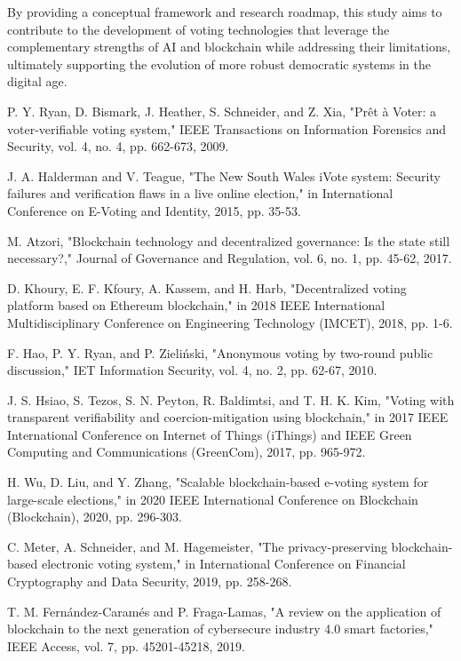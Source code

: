 \documentclass[conference]{IEEEtran}
\begin{document}
By providing a conceptual framework and research roadmap, this study aims to contribute to the development of voting technologies that leverage the complementary strengths of AI and blockchain while addressing their limitations, ultimately supporting the evolution of more robust democratic systems in the digital age.

\begin{thebibliography}{10}

 P. Y. Ryan, D. Bismark, J. Heather, S. Schneider, and Z. Xia, "Prêt à Voter: a voter-verifiable voting system," IEEE Transactions on Information Forensics and Security, vol. 4, no. 4, pp. 662-673, 2009.

 J. A. Halderman and V. Teague, "The New South Wales iVote system: Security failures and verification flaws in a live online election," in International Conference on E-Voting and Identity, 2015, pp. 35-53.

 M. Atzori, "Blockchain technology and decentralized governance: Is the state still necessary?," Journal of Governance and Regulation, vol. 6, no. 1, pp. 45-62, 2017.

 D. Khoury, E. F. Kfoury, A. Kassem, and H. Harb, "Decentralized voting platform based on Ethereum blockchain," in 2018 IEEE International Multidisciplinary Conference on Engineering Technology (IMCET), 2018, pp. 1-6.

 F. Hao, P. Y. Ryan, and P. Zieliński, "Anonymous voting by two-round public discussion," IET Information Security, vol. 4, no. 2, pp. 62-67, 2010.

 J. S. Hsiao, S. Tezos, S. N. Peyton, R. Baldimtsi, and T. H. K. Kim, "Voting with transparent verifiability and coercion-mitigation using blockchain," in 2017 IEEE International Conference on Internet of Things (iThings) and IEEE Green Computing and Communications (GreenCom), 2017, pp. 965-972.

 H. Wu, D. Liu, and Y. Zhang, "Scalable blockchain-based e-voting system for large-scale elections," in 2020 IEEE International Conference on Blockchain (Blockchain), 2020, pp. 296-303.

 C. Meter, A. Schneider, and M. Hagemeister, "The privacy-preserving blockchain-based electronic voting system," in International Conference on Financial Cryptography and Data Security, 2019, pp. 258-268.

 T. M. Fernández-Caramés and P. Fraga-Lamas, "A review on the application of blockchain to the next generation of cybersecure industry 4.0 smart factories," IEEE Access, vol. 7, pp. 45201-45218, 2019.


\end{thebibliography}
\end{document}
